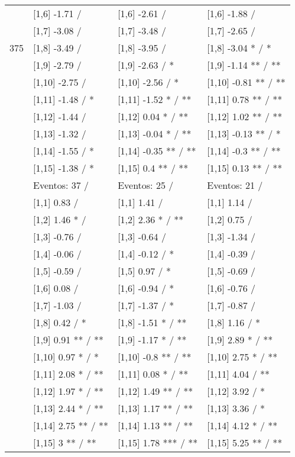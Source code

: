 \begin{table}
\begin{tabular}[t]{llll}
 & {}[1,6] -1.71  / & {}[1,6] -2.61  / & {}[1,6] -1.88  /\\
 & {}[1,7] -3.08  / & {}[1,7] -3.48  / & {}[1,7] -2.65  /\\
375 & {}[1,8] -3.49  / & {}[1,8] -3.95  / & {}[1,8] -3.04 * / *\\
\addlinespace
 & {}[1,9] -2.79  / & {}[1,9] -2.63  / * & {}[1,9] -1.14 ** / **\\
 & {}[1,10] -2.75  / & {}[1,10] -2.56  / * & {}[1,10] -0.81 ** / **\\
 & {}[1,11] -1.48  / * & {}[1,11] -1.52 * / ** & {}[1,11] 0.78 ** / **\\
 & {}[1,12] -1.44  / & {}[1,12] 0.04 * / ** & {}[1,12] 1.02 ** / **\\
 & {}[1,13] -1.32  / & {}[1,13] -0.04 * / ** & {}[1,13] -0.13 ** / *\\
\addlinespace
 & {}[1,14] -1.55  / * & {}[1,14] -0.35 ** / ** & {}[1,14] -0.3 ** / **\\
 & {}[1,15] -1.38  / * & {}[1,15] 0.4 ** / ** & {}[1,15] 0.13 ** / **\\
 & Eventos:  37 / & Eventos:  25 / & Eventos:  21 /\\
 & {}[1,1] 0.83  / & {}[1,1] 1.41  / & {}[1,1] 1.14  /\\
 & {}[1,2] 1.46 * / & {}[1,2] 2.36 * / ** & {}[1,2] 0.75  /\\
\addlinespace
 & {}[1,3] -0.76  / & {}[1,3] -0.64  / & {}[1,3] -1.34  /\\
 & {}[1,4] -0.06  / & {}[1,4] -0.12  / * & {}[1,4] -0.39  /\\
 & {}[1,5] -0.59  / & {}[1,5] 0.97  / * & {}[1,5] -0.69  /\\
 & {}[1,6] 0.08  / & {}[1,6] -0.94  / * & {}[1,6] -0.76  /\\
 & {}[1,7] -1.03  / & {}[1,7] -1.37  / * & {}[1,7] -0.87  /\\
\addlinespace
500 & {}[1,8] 0.42  / * & {}[1,8] -1.51 * / ** & {}[1,8] 1.16  / *\\
 & {}[1,9] 0.91 ** / ** & {}[1,9] -1.17 * / ** & {}[1,9] 2.89 * / **\\
 & {}[1,10] 0.97 * / * & {}[1,10] -0.8 ** / ** & {}[1,10] 2.75 * / **\\
 & {}[1,11] 2.08 * / ** & {}[1,11] 0.08 * / ** & {}[1,11] 4.04  / **\\
 & {}[1,12] 1.97 * / ** & {}[1,12] 1.49 ** / ** & {}[1,12] 3.92  / *\\
\addlinespace
 & {}[1,13] 2.44 * / ** & {}[1,13] 1.17 ** / ** & {}[1,13] 3.36  / *\\
 & {}[1,14] 2.75 ** / ** & {}[1,14] 1.13 ** / ** & {}[1,14] 4.12 * / **\\
 & {}[1,15] 3 ** / ** & {}[1,15] 1.78 *** / ** & {}[1,15] 5.25 ** / **\\
\bottomrule
\end{tabular}
\end{table}
